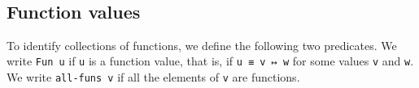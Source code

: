 \begin{fence}
\begin{code}%
\>[0]%
\>[1880I]\AgdaSymbol{:}\AgdaSpace{}%
\AgdaSpace{}%
\AgdaSpace{}%
\AgdaSpace{}%
\AgdaSymbol{:}\AgdaSpace{}%
\AgdaSymbol{\}}\<%
\\
\>[.][@{}l@{}]\<[1880I]%
\>[5]%
\>[1886I]\AgdaSpace{}%
\AgdaSpace{}%
\AgdaSpace{}%
\AgdaSpace{}%
\<%
\\
\>[.][@{}l@{}]\<[1886I]%
\>[7]\AgdaComment{---------}\<%
\\
%
\>[5]\AgdaSpace{}%
\AgdaSpace{}%
\AgdaSpace{}%
\AgdaSpace{}%
\AgdaSpace{}%
\<%
\\
\>[0]\AgdaSpace{}%
\AgdaSpace{}%
\AgdaSymbol{=}\AgdaSpace{}%
\AgdaSpace{}%
\<%
\end{code}
\end{fence}

\hypertarget{function-values}{%
\subsection{Function values}\label{function-values}}

To identify collections of functions, we define the following two
predicates. We write \texttt{Fun\ u} if \texttt{u} is a function value,
that is, if \texttt{u\ ≡\ v\ ↦\ w} for some values \texttt{v} and
\texttt{w}. We write \texttt{all-funs\ v} if all the elements of
\texttt{v} are functions.

